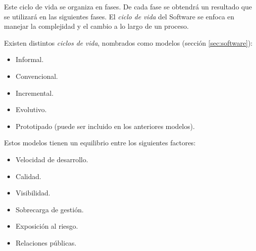 Este ciclo de vida se organiza en fases. De cada fase se obtendrá un
resultado que se utilizará en las siguientes fases. El \emph{ciclo de
  vida} del Software se enfoca en manejar la complejidad y el cambio
a lo largo de un proceso.

Existen distintos \emph{ciclos de vida}, nombrados como modelos
(sección \ref{sec:software}):
\begin{itemize}[noitemsep]
\item Informal.
\item Convencional.
\item Incremental.
\item Evolutivo.
\item Prototipado (puede ser incluido en los anteriores modelos).
\end{itemize}

Estos modelos tienen un equilibrio entre los siguientes factores:
\begin{itemize}[noitemsep]
\item Velocidad de desarrollo.
\item Calidad.
\item Visibilidad.
\item Sobrecarga de gestión.
\item Exposición al riesgo.
\item Relaciones públicas.
\end{itemize}
